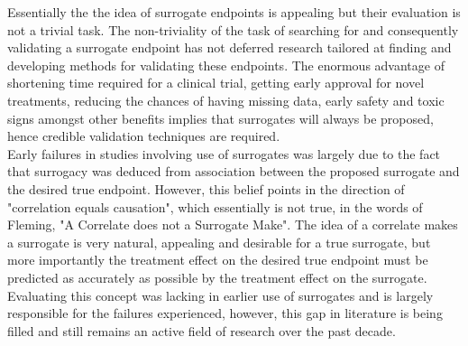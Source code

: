 \documentclass[a4paper,12pt]{article}
\begin{document}
	Essentially the the idea of surrogate endpoints is appealing but their evaluation is not a trivial task\citep{surrogate2}. The non-triviality of the task of searching for and consequently validating a surrogate endpoint has not deferred research tailored at finding and developing methods for validating these endpoints\citep{surrogate2, surrogate3,surrogate1}. The enormous advantage of shortening time required for a clinical trial, getting early approval for novel treatments, reducing the chances of having missing data, early safety and toxic signs amongst other benefits implies that surrogates will always be proposed, hence credible validation techniques are required\citep{buyseM}. \\
	
	Early failures in studies involving use of surrogates was largely due to the fact that surrogacy was deduced from association between the proposed surrogate and the desired true endpoint\citep{buyseM}. However, this belief points in the direction of "correlation equals causation", which essentially is not true, in the words of Fleming, "A Correlate does not a Surrogate Make"\citep{fleming3,fleming2,buyseM}. The idea of a correlate makes a surrogate is very natural, appealing and desirable for a true surrogate\citep{wim2016}, but more importantly the treatment effect on the desired true endpoint must be predicted as accurately as possible by the treatment effect on the surrogate\citep{buyseM,surrogate2}. Evaluating this concept was lacking in earlier use of surrogates and is largely responsible for the failures experienced, however, this gap in literature is being filled and still remains an active field of research over the past decade. %
	
\end{document}
